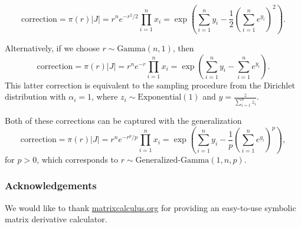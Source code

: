\documentclass[11pt]{article}
\begin{document}
\[
  \mathrm{correction}
  = \pi(r) |J| = r^n e^{-r^2/2} \prod_{i=1}^n x_i
  = \exp\left(\sum_{i=1}^n y_i - \frac{1}{2}\left(\sum_{i=1}^n
      e^{y_i}\right)^2\right).
\]

Alternatively, if we choose $r \sim \mathrm{Gamma}(n, 1)$, then
\[
  \mathrm{correction} = \pi(r) |J| = r^n e^{-r} \prod_{i=1}^n x_i =
  \exp\left(\sum_{i=1}^n y_i - \sum_{i=1}^n e^{y_i}\right).
\]
This latter correction is equivalent to the sampling procedure from
the Dirichlet distribution with $\alpha_i=1$, where
$z_i \sim \mathrm{Exponential}(1)$ and
$y = \frac{z}{\sum_{i=1}^n z_i}$.

Both of these corrections can be captured with the generalization
\[
  \mathrm{correction}
  = \pi(r) |J|
  = r^n e^{-r^p/p} \prod_{i=1}^n x_i
  = \exp\left(\sum_{i=1}^n y_i - \frac{1}{p} \left(\sum_{i=1}^n e^{y_i}\right)^p\right),
\]
for $p > 0$, which corresponds to $r \sim \text{Generalized-Gamma}(1, n, p)$.


\subsubsection*{Acknowledgements}

We would like to thank \url{matrixcalculus.org} for providing an
easy-to-use symbolic matrix derivative calculator.



{}

\end{document}
